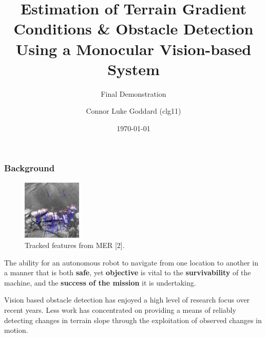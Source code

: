 \documentclass[10pt, compress]{beamer}
\title{Estimation of Terrain Gradient Conditions \& Obstacle Detection Using a Monocular Vision-based System}
\subtitle{Final Demonstration}
\date{\today}
\author{Connor Luke Goddard (clg11)}
\institute{Department of Computer Science, Aberystwyth University}
\begin{document}
\maketitle


\begin{frame}[fragile]
  \frametitle{Background}
  
  \vspace{-10pt}
	
     \begin{block}{}  

	          \begin{figure}
   \vspace{-20pt}
  \begin{center}
    \includegraphics[width=0.25\textwidth]{mars.jpg}
  \end{center}
  \vspace{-15pt}  \caption{Tracked features from MER [2].}
  \end{figure}
  
  The ability for an autonomous robot to navigate from one location to another in a manner that is both \textbf{safe}, yet \textbf{objective} is vital to the \textbf{survivability} of the machine, and the \textbf{success of the mission} it is undertaking.    
		
       \end{block}

\vspace{15pt}
	
   \begin{block}{}
Vision based obstacle detection has enjoyed a high level of research focus over recent years. Less work has concentrated on providing a means of reliably detecting changes in terrain slope through the exploitation of observed changes in motion. 
  \end{block}


\end{frame}
\end{document}

